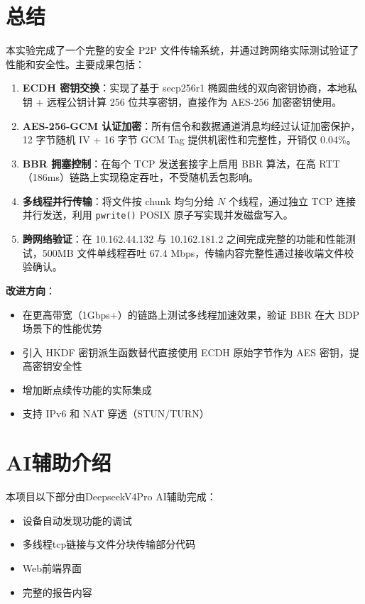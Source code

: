 \documentclass[12pt]{article}
\begin{document}
\section{总结}

本实验完成了一个完整的安全 P2P 文件传输系统，并通过跨网络实际测试验证了性能和安全性。主要成果包括：

\begin{enumerate}
    \item \textbf{ECDH 密钥交换}：实现了基于 secp256r1 椭圆曲线的双向密钥协商，本地私钥 + 远程公钥计算 256 位共享密钥，直接作为 AES-256 加密密钥使用。
    \item \textbf{AES-256-GCM 认证加密}：所有信令和数据通道消息均经过认证加密保护，12 字节随机 IV + 16 字节 GCM Tag 提供机密性和完整性，开销仅 0.04\%。
    \item \textbf{BBR 拥塞控制}：在每个 TCP 发送套接字上启用 BBR 算法，在高 RTT（186ms）链路上实现稳定吞吐，不受随机丢包影响。
    \item \textbf{多线程并行传输}：将文件按 chunk 均匀分给 $N$ 个线程，通过独立 TCP 连接并行发送，利用 \texttt{pwrite()} POSIX 原子写实现并发磁盘写入。
    \item \textbf{跨网络验证}：在 10.162.44.132 与 10.162.181.2 之间完成完整的功能和性能测试，500MB 文件单线程吞吐 67.4 Mbps，传输内容完整性通过接收端文件校验确认。
\end{enumerate}

\textbf{改进方向}：

\begin{itemize}
    \item 在更高带宽（1Gbps+）的链路上测试多线程加速效果，验证 BBR 在大 BDP 场景下的性能优势
    \item 引入 HKDF 密钥派生函数替代直接使用 ECDH 原始字节作为 AES 密钥，提高密钥安全性
    \item 增加断点续传功能的实际集成
    \item 支持 IPv6 和 NAT 穿透（STUN/TURN）
\end{itemize}

\section{AI辅助介绍}

本项目以下部分由DeepseekV4Pro AI辅助完成：
\begin{itemize}
    \item 设备自动发现功能的调试
    \item 多线程tcp链接与文件分块传输部分代码
    \item Web前端界面
    \item 完整的报告内容
\end{itemize}
\end{document}
